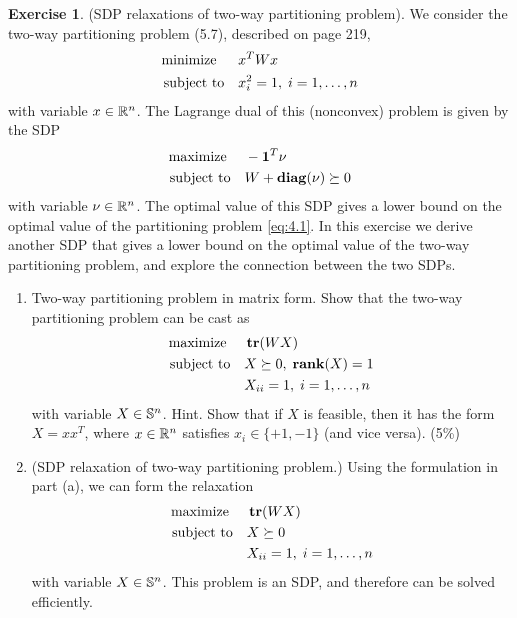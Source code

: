 \documentclass[12pt]{extarticle}
\theoremstyle{definition}
\newtheorem{exercise}{Exercise}
\begin{document}
\begin{exercise}
  (SDP relaxations of two-way partitioning problem).
  We consider the two-way partitioning problem (5.7), described on page 219,
  \begin{align}
    \text{minimize\;\;}\quad& x^TWx\nonumber\\
    \text{subject to}  \quad& x_i^2=1,\;i=1,\dots,n\label{eq:4.1}
  \end{align}
  with variable $x\in\mathbb{R}^n$.
  The Lagrange dual of this (nonconvex) problem is given by the SDP
  \begin{align}
    \text{maximize\;}\quad& -\mathbf 1^T\nu\nonumber\\
    \text{subject to}\quad& W+\mathop{\bf diag}(\nu)\succeq 0\label{eq:4.2}
  \end{align}
  with variable $\nu\in\mathbb{R}^n$.
  The optimal value of this SDP gives a lower bound on the optimal value of the partitioning problem \eqref{eq:4.1}.
  In this exercise we derive another SDP that gives a lower bound on the optimal value of the two-way partitioning problem, and explore the connection between the two SDPs.
  \begin{enumerate}[label=(\alph*)]
    \item Two-way partitioning problem in matrix form.
          Show that the two-way partitioning problem can be cast as
          \begin{align*}
            \text{maximize\;}\quad& \mathop{\bf tr}(WX)\\
            \text{subject to}\quad& X\succeq 0,\;\mathop{\bf rank}(X)=1\\
                                  & X_{ii}=1,\;i=1,\dots,n
          \end{align*}
          with variable $X\in\mathbb{S}^n$.
          Hint.
          Show that if $X$ is feasible, then it has the form $X=xx^T$, where $x\in\mathbb{R}^n$ satisfies $x_i\in\{+1,-1\}$ (and vice versa). (5\%)
    \item (SDP relaxation of two-way partitioning problem.) 
          Using the formulation in part (a), we can form the relaxation
          \begin{align}
            \text{maximize\;}\quad& \mathop{\bf tr}(WX)\nonumber\\
            \text{subject to}\quad& X\succeq 0\label{eq:4.3}\\
                                  & X_{ii}=1,\;i=1,\dots,n\nonumber
          \end{align}
          with variable $X\in\mathbb{S}^n$.
          This problem is an SDP, and therefore can be solved efficiently.

\end{enumerate}
\end{exercise}
\end{document}
